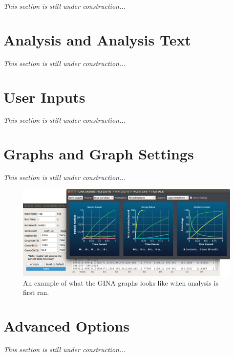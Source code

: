 \textit{This section is still under construction...}

\section{Analysis and Analysis Text}

\textit{This section is still under construction...}

\section{User Inputs}

\textit{This section is still under construction...}

\section{Graphs and Graph Settings}

\textit{This section is still under construction...}

\begin{figure}[h!]
	\includegraphics[scale =0.475]{./Images/GINAexample.png}
	\caption{An example of what the GINA graphs looks like when analysis is first ran.}
	\label{fig:graphs}
\end{figure}

\section{Advanced Options}

\textit{This section is still under construction...}
